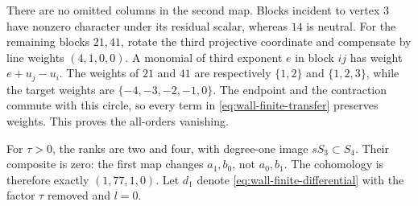 \documentclass[11pt]{amsart}
\theoremstyle{definition}
\theoremstyle{remark}
\begin{document}
There are no omitted columns in the second map. Blocks incident to
vertex $3$ have nonzero character under its residual scalar, whereas
$14$ is neutral. For the remaining blocks $21,41$, rotate the third
projective coordinate and compensate by line weights $(4,1,0,0)$.
A monomial of third exponent $e$ in block $ij$ has weight
$e+u_j-u_i$. The weights of $21$ and $41$ are respectively
$\{1,2\}$ and $\{1,2,3\}$, while the target weights are
$\{-4,-3,-2,-1,0\}$. The endpoint and the contraction commute
with this circle, so every term in \eqref{eq:wall-finite-transfer}
preserves weights. This proves the all-orders vanishing.

For $\tau>0$, the ranks are two and four, with degree-one image
$sS_3\subset S_4$. Their composite is zero: the first map changes
$a_1,b_0$, not $a_0,b_1$. The cohomology is therefore exactly
$(1,77,1,0)$. Let $d_1$ denote \eqref{eq:wall-finite-differential}
with the factor $\tau$ removed and $l=0$.
\end{document}
